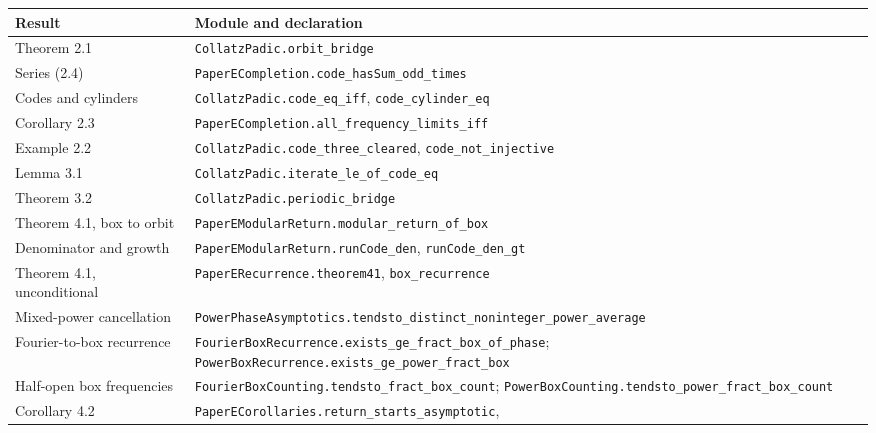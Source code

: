 \documentclass[11pt,a4paper]{article}
\begin{document}
\begin{longtable}[]{@{}
  >{\raggedright\arraybackslash}p{}
  >{\raggedright\arraybackslash}p{}@{}}
\toprule\noalign{}
\begin{minipage}[b]{\linewidth}\raggedright
Result
\end{minipage} & \begin{minipage}[b]{\linewidth}\raggedright
Module and declaration
\end{minipage} \\
\midrule\noalign{}
\endhead
\bottomrule\noalign{}
\endfoot
\bottomrule\noalign{}
\endlastfoot
Theorem 2.1 & \texttt{\nolinkurl{CollatzPadic.orbit_bridge}} \\
Series (2.4) &
\texttt{\nolinkurl{PaperECompletion.code_hasSum_odd_times}} \\
Codes and cylinders & \texttt{\nolinkurl{CollatzPadic.code_eq_iff}},
\texttt{\nolinkurl{code_cylinder_eq}} \\
Corollary 2.3 &
\texttt{\nolinkurl{PaperECompletion.all_frequency_limits_iff}} \\
Example 2.2 & \texttt{\nolinkurl{CollatzPadic.code_three_cleared}},
\texttt{\nolinkurl{code_not_injective}} \\
Lemma 3.1 & \texttt{\nolinkurl{CollatzPadic.iterate_le_of_code_eq}} \\
Theorem 3.2 & \texttt{\nolinkurl{CollatzPadic.periodic_bridge}} \\
Theorem 4.1, box to orbit &
\texttt{\nolinkurl{PaperEModularReturn.modular_return_of_box}} \\
Denominator and growth &
\texttt{\nolinkurl{PaperEModularReturn.runCode_den}},
\texttt{\nolinkurl{runCode_den_gt}} \\
Theorem 4.1, unconditional &
\texttt{\nolinkurl{PaperERecurrence.theorem41}},
\texttt{\nolinkurl{box_recurrence}} \\
Mixed-power cancellation &
\texttt{\nolinkurl{PowerPhaseAsymptotics.tendsto_distinct_noninteger_power_average}} \\
Fourier-to-box recurrence &
\texttt{\nolinkurl{FourierBoxRecurrence.exists_ge_fract_box_of_phase}};
\texttt{\nolinkurl{PowerBoxRecurrence.exists_ge_power_fract_box}} \\
Half-open box frequencies &
\texttt{\nolinkurl{FourierBoxCounting.tendsto_fract_box_count}};
\texttt{\nolinkurl{PowerBoxCounting.tendsto_power_fract_box_count}} \\
Corollary 4.2 &
\texttt{\nolinkurl{PaperECorollaries.return_starts_asymptotic}},

\end{longtable}
\end{document}
